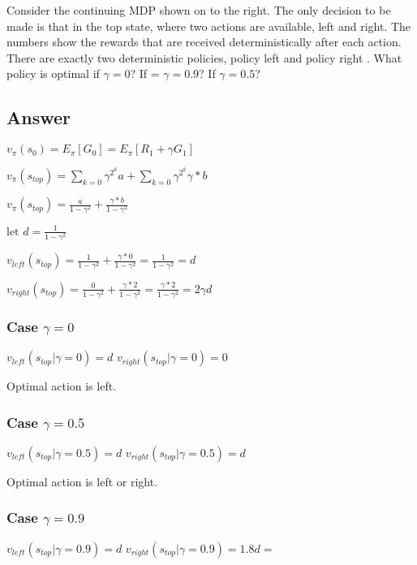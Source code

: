\documentclass[11pt]{article}
\begin{document}
    Consider the continuing MDP shown on to the right.
    The only decision to be made is that in the top state, where two actions are available, left and right.
    The numbers show the rewards that are received deterministically after each action.
    There are exactly two deterministic policies, policy left and policy right .
    What policy is optimal if $\gamma = 0$? If = $\gamma = 0.9$? If $\gamma = 0.5$?

    \subsection*{Answer}

    $ v_{\pi}(s_{0}) = E_{\pi}[G_{0}] =  E_{\pi}[R_{1} + \gamma G_{1}] $

    $ v_{\pi}(s_{top}) = \sum_{k=0} \gamma^{2^{k}}a + \sum_{k=0} \gamma^{2^{k}}\gamma*b $

    $ v_{\pi}(s_{top}) = \frac{a}{1-\gamma^{2}} + \frac{\gamma * b}{1-\gamma^{2}} $

    $ \text{let } d = \frac{1}{1-\gamma^{2}} $

    $ v_{left}(s_{top}) = \frac{1}{1-\gamma^{2}} + \frac{\gamma * 0}{1-\gamma^{2}} = \frac{1}{1-\gamma^{2}} = d $

    $ v_{right}(s_{top}) = \frac{0}{1-\gamma^{2}} + \frac{\gamma * 2}{1-\gamma^{2}} = \frac{\gamma * 2}{1-\gamma^{2}} = 2 \gamma d $

    \subsubsection*{Case $\gamma=0$}

    $ v_{left}(s_{top} | \gamma=0) = d $
    $ v_{right}(s_{top} | \gamma=0) = 0 $

    Optimal action is left.


    \subsubsection*{Case $\gamma=0.5$}

    $ v_{left}(s_{top} | \gamma=0.5) = d $
    $ v_{right}(s_{top} | \gamma=0.5) = d $

    Optimal action is left or right.

    \subsubsection*{Case $\gamma=0.9$}

    $ v_{left}(s_{top} | \gamma=0.9) = d $
    $ v_{right}(s_{top} | \gamma=0.9) = 1.8d =  $
\end{document}
